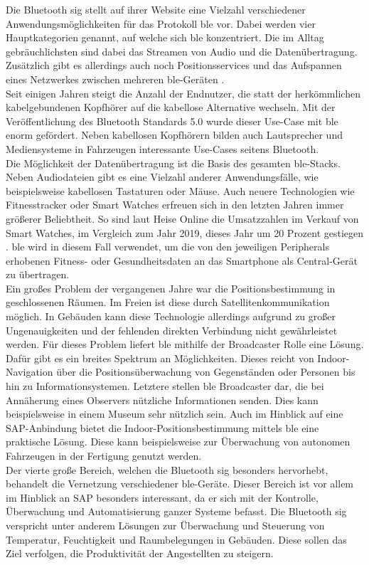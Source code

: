 \noindent Die Bluetooth \ac{sig} stellt auf ihrer Website eine Vielzahl verschiedener Anwendungsmöglichkeiten für das Protokoll \ac{ble} vor. Dabei werden vier Hauptkategorien genannt, auf welche sich \ac{ble} konzentriert. Die im Alltag gebräuchlichsten sind dabei das Streamen von Audio und die Datenübertragung. Zusätzlich gibt es allerdings auch noch Positionsservices und das Aufspannen eines Netzwerkes zwischen mehreren \ac{ble}-Geräten \cite{BLU20:WWW}.\\
\noindent Seit einigen Jahren steigt die Anzahl der Endnutzer, die statt der herkömmlichen kabelgebundenen Kopfhörer auf die kabellose Alternative wechseln. Mit der Veröffentlichung des Bluetooth Standards 5.0 wurde dieser Use-Case mit \ac{ble} enorm gefördert. Neben kabellosen Kopfhörern bilden auch Lautsprecher und Mediensysteme in Fahrzeugen interessante Use-Cases seitens Bluetooth.\\
\noindent Die Möglichkeit der Datenübertragung ist die Basis des gesamten \ac{ble}-Stacks. Neben Audiodateien gibt es eine Vielzahl anderer Anwendungsfälle, wie beispielsweise kabellosen Tastaturen oder Mäuse. Auch neuere Technologien wie Fitnesstracker oder Smart Watches erfreuen sich in den letzten Jahren immer größerer Beliebtheit. So sind laut Heise Online die Umsatzzahlen im Verkauf von Smart Watches, im Vergleich zum Jahr 2019, dieses Jahr um 20 Prozent gestiegen \cite{HEI20:WWW}. \ac{ble} wird in diesem Fall verwendet, um die von den jeweiligen Peripherals erhobenen Fitness- oder Gesundheitsdaten an das Smartphone als Central-Gerät zu übertragen.\\
\noindent Ein großes Problem der vergangenen Jahre war die Positionsbestimmung in geschlossenen Räumen. Im Freien ist diese durch Satellitenkommunikation möglich. In Gebäuden kann diese Technologie allerdings aufgrund zu großer Ungenauigkeiten und der fehlenden direkten Verbindung nicht gewährleistet werden. Für dieses Problem liefert \ac{ble} mithilfe der Broadcaster Rolle eine Lösung. Dafür gibt es ein breites Spektrum an Möglichkeiten. Dieses reicht von Indoor-Navigation über die Positionsüberwachung von Gegenständen oder Personen bis hin zu Informationsystemen. Letztere stellen \ac{ble} Broadcaster dar, die bei Annäherung eines Observers nützliche Informationen senden. Dies kann beispielsweise in einem Museum sehr nützlich sein. Auch im Hinblick auf eine SAP-Anbindung bietet die Indoor-Positionsbestimmung mittels \ac{ble} eine praktische Lösung. Diese kann beispielsweise zur Überwachung von autonomen Fahrzeugen in der Fertigung genutzt werden.\\          
\noindent Der vierte große Bereich, welchen die Bluetooth \ac{sig} besonders hervorhebt, behandelt die Vernetzung verschiedener \ac{ble}-Geräte. Dieser Bereich ist vor allem im Hinblick an SAP besonders interessant, da er sich mit der Kontrolle, Überwachung und Automatisierung ganzer Systeme befasst. Die Bluetooth \ac{sig} verspricht unter anderem Lösungen zur Überwachung und Steuerung von Temperatur, Feuchtigkeit und Raumbelegungen in Gebäuden. Diese sollen das Ziel verfolgen, die Produktivität der Angestellten zu steigern.\\   

